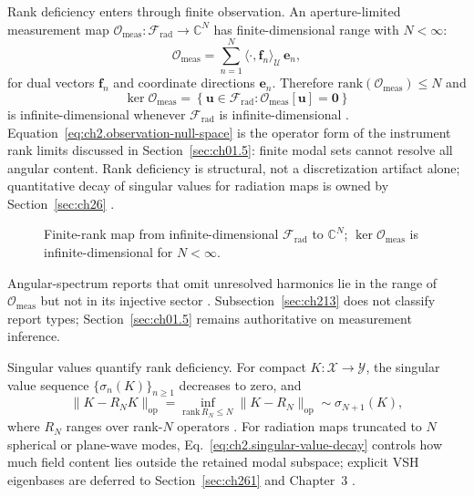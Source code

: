 Rank deficiency enters through finite observation. An aperture-limited measurement map \(\mathcal{O}_{\mathrm{meas}}:\mathcal{F}_{\mathrm{rad}}\to\mathbb{C}^{N}\) has finite-dimensional range with \(N<\infty\):
\begin{equation}
\label{eq:ch2.finite-rank-observation}
\mathcal{O}_{\mathrm{meas}}
=
\sum_{n=1}^{N}\langle\cdot,\mathbf{f}_n\rangle_{\mathcal{U}}\,\mathbf{e}_n,
\end{equation}
for dual vectors \(\mathbf{f}_n\) and coordinate directions \(\mathbf{e}_n\). Therefore \(\mathrm{rank}(\mathcal{O}_{\mathrm{meas}})\le N\) and
\begin{equation}
\label{eq:ch2.observation-null-space}
\ker\mathcal{O}_{\mathrm{meas}}
=
\left\{
\mathbf{u}\in\mathcal{F}_{\mathrm{rad}}:
\mathcal{O}_{\mathrm{meas}}[\mathbf{u}]=\mathbf{0}
\right\}
\end{equation}
is infinite-dimensional whenever \(\mathcal{F}_{\mathrm{rad}}\) is infinite-dimensional \cite{stratton1941}. Equation~\eqref{eq:ch2.observation-null-space} is the operator form of the instrument rank limits discussed in Section~\ref{sec:ch01.5}: finite modal sets cannot resolve all angular content. Rank deficiency is structural, not a discretization artifact alone; quantitative decay of singular values for radiation maps is owned by Section~\ref{sec:ch26} \cite{stratton1941}.
\begin{figure}[t]
\centering
{}
\caption{Finite-rank map from infinite-dimensional \(\mathcal{F}_{\mathrm{rad}}\) to \(\mathbb{C}^{N}\); \(\ker\mathcal{O}_{\mathrm{meas}}\) is infinite-dimensional for \(N<\infty\).}
\label{fig:ch2.rank-deficient-observation}
\end{figure}
Angular-spectrum reports that omit unresolved harmonics lie in the range of \(\mathcal{O}_{\mathrm{meas}}\) but not in its injective sector \cite{stratton1941}. Subsection~\ref{sec:ch213} does not classify report types; Section~\ref{sec:ch01.5} remains authoritative on measurement inference.

Singular values quantify rank deficiency. For compact \(K:\mathcal{X}\to\mathcal{Y}\), the singular value sequence \(\{\sigma_n(K)\}_{n\ge 1}\) decreases to zero, and
\begin{equation}
\label{eq:ch2.singular-value-decay}
\|K-R_N K\|_{\mathrm{op}}
=
\inf_{\mathrm{rank}\,R_N\le N}\|K-R_N\|_{\mathrm{op}}
\sim \sigma_{N+1}(K),
\end{equation}
where \(R_N\) ranges over rank-\(N\) operators \cite{stratton1941}. For radiation maps truncated to \(N\) spherical or plane-wave modes, Eq.~\eqref{eq:ch2.singular-value-decay} controls how much field content lies outside the retained modal subspace; explicit VSH eigenbases are deferred to Section~\ref{sec:ch261} and Chapter~3 \cite{harrington2001}.

